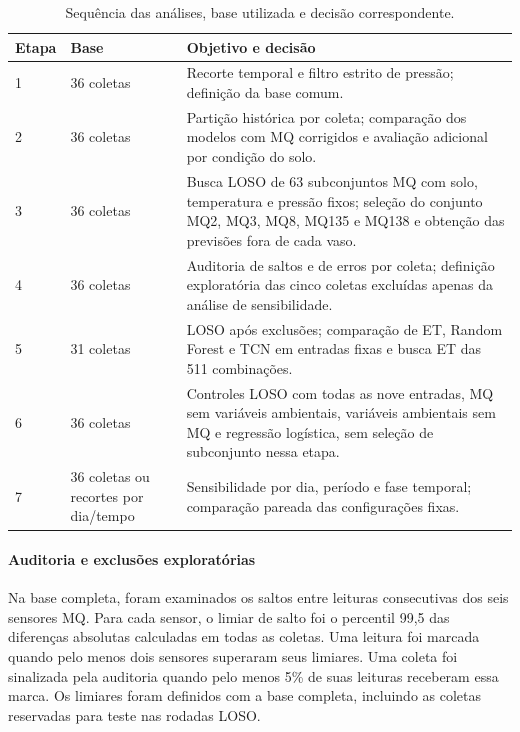\begin{table}[H]
    \centering
    \footnotesize
    \caption{Sequência das análises, base utilizada e decisão correspondente.}
    \label{tab:cronologia_analises}
    \begin{tabular}{p{}p{}p{}}
        \hline
        Etapa & Base & Objetivo e decisão \\
        \hline
        1 & 36 coletas & Recorte temporal e filtro estrito de pressão; definição da base comum. \\
        2 & 36 coletas & Partição histórica por coleta; comparação dos modelos com MQ corrigidos e avaliação adicional por condição do solo. \\
        3 & 36 coletas & Busca LOSO de 63 subconjuntos MQ com solo, temperatura e pressão fixos; seleção do conjunto MQ2, MQ3, MQ8, MQ135 e MQ138 e obtenção das previsões fora de cada vaso. \\
        4 & 36 coletas & Auditoria de saltos e de erros por coleta; definição exploratória das cinco coletas excluídas apenas da análise de sensibilidade. \\
        5 & 31 coletas & LOSO após exclusões; comparação de ET, Random Forest e TCN em entradas fixas e busca ET das 511 combinações. \\
        6 & 36 coletas & Controles LOSO com todas as nove entradas, MQ sem variáveis ambientais, variáveis ambientais sem MQ e regressão logística, sem seleção de subconjunto nessa etapa. \\
        7 & 36 coletas ou recortes por dia/tempo & Sensibilidade por dia, período e fase temporal; comparação pareada das configurações fixas. \\
        \hline
    \end{tabular}
\end{table}


\paragraph{Auditoria e exclusões exploratórias}
\label{subsec:auditoria_coletas_loso}

Na base completa, foram examinados os saltos entre leituras consecutivas dos
seis sensores MQ. Para cada sensor, o limiar de salto foi o percentil 99,5 das
diferenças absolutas calculadas em todas as coletas. Uma leitura foi marcada
quando pelo menos dois sensores superaram seus limiares. Uma coleta foi
sinalizada pela auditoria quando pelo menos 5\% de suas leituras receberam
essa marca. Os limiares foram definidos com a base completa, incluindo as
coletas reservadas para teste nas rodadas LOSO.

